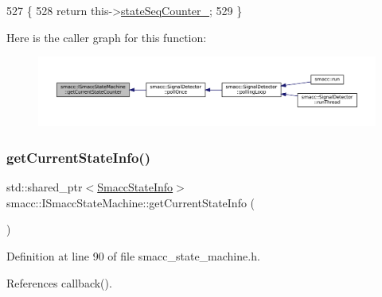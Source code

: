 \begin{DoxyCode}
527   \{
528     \textcolor{keywordflow}{return} this->\hyperlink{classsmacc_1_1ISmaccStateMachine_ab41ee07d20715142e2f7c92d551b2bd6}{stateSeqCounter\_};
529   \}
\end{DoxyCode}
Here is the caller graph for this function\+:
\nopagebreak
\begin{figure}[H]
\begin{center}
\leavevmode
\includegraphics[width=350pt]{classsmacc_1_1ISmaccStateMachine_aad27c0182b53245d0aded22e63cd83bd_icgraph}
\end{center}
\end{figure}
\mbox{\label{classsmacc_1_1ISmaccStateMachine_a4738679e8e5f7adab35e610dce0bfff7}} 
\subsubsection{\texorpdfstring{get\+Current\+State\+Info()}{getCurrentStateInfo()}}
{\footnotesize\ttfamily std\+::shared\+\_\+ptr$<$\hyperlink{classsmacc_1_1introspection_1_1SmaccStateInfo}{Smacc\+State\+Info}$>$ smacc\+::\+I\+Smacc\+State\+Machine\+::get\+Current\+State\+Info (\begin{DoxyParamCaption}{ }\end{DoxyParamCaption})\hspace{0.3cm}{\ttfamily [inline]}}



Definition at line 90 of file smacc\+\_\+state\+\_\+machine.\+h.



References callback().


